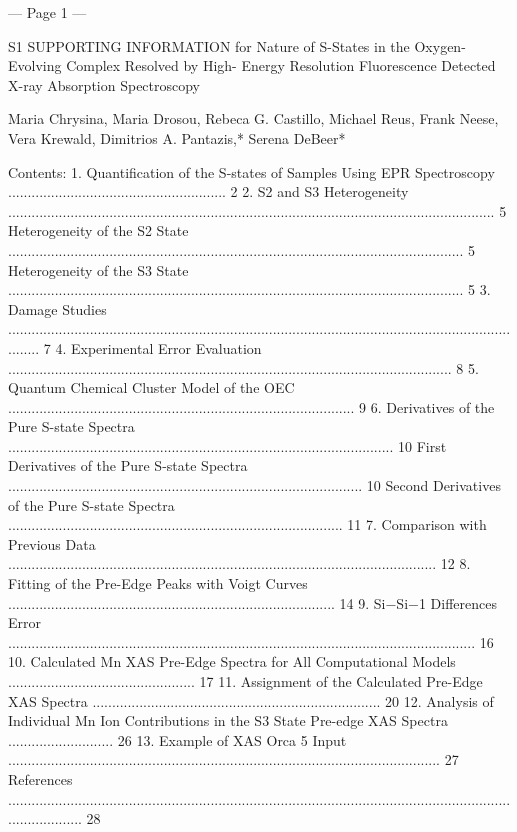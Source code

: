--- Page 1 ---
 
S1 
SUPPORTING INFORMATION 
for 
Nature of S-States in the Oxygen-Evolving Complex Resolved by High-
Energy Resolution Fluorescence Detected X-ray Absorption 
Spectroscopy 
 
Maria Chrysina, Maria Drosou, Rebeca G. Castillo, Michael Reus, Frank Neese, Vera Krewald, 
Dimitrios A. Pantazis,* Serena DeBeer* 
 
Contents: 
1. Quantification of the S-states of Samples Using EPR Spectroscopy ........................................................ 2 
2. S2 and S3 Heterogeneity ............................................................................................................................. 5 
Heterogeneity of the S2 State ..................................................................................................................... 5 
Heterogeneity of the S3 State ..................................................................................................................... 5 
3. Damage Studies ......................................................................................................................................... 7 
4. Experimental Error Evaluation .................................................................................................................. 8 
5. Quantum Chemical Cluster Model of the OEC ......................................................................................... 9 
6. Derivatives of the Pure S-state Spectra ................................................................................................... 10 
First Derivatives of the Pure S-state Spectra ........................................................................................... 10 
Second Derivatives of the Pure S-state Spectra ...................................................................................... 11 
7. Comparison with Previous Data .............................................................................................................. 12 
8. Fitting of the Pre-Edge Peaks with Voigt Curves .................................................................................... 14 
9. Si−Si−1  Differences Error ........................................................................................................................ 16 
10. Calculated Mn XAS Pre-Edge Spectra for All Computational Models ................................................ 17 
11. Assignment of the Calculated Pre-Edge XAS Spectra .......................................................................... 20 
12. Analysis of Individual Mn Ion Contributions in the S3 State Pre-edge XAS Spectra ........................... 26 
13. Example of XAS Orca 5 Input ............................................................................................................... 27 
References .................................................................................................................................................... 28 
 
